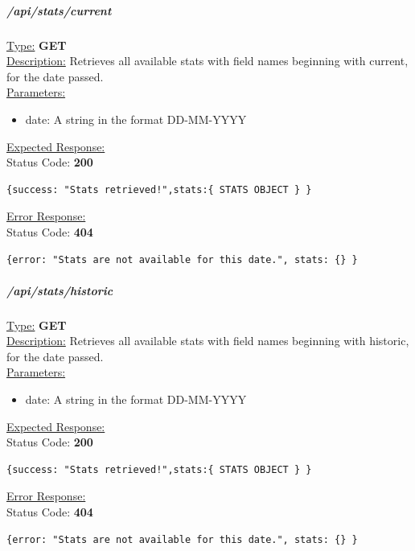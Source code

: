 \documentclass[draft,preprint,12pt,3p]{elsarticle}
\newcommand{\forceindent}{\leavevmode{\parindent=1em\indent}}
\begin{document}
\subparagraph*{/api/stats/current}
\underline{Type:} \textbf{GET}\\

\underline{Description:} Retrieves all available stats with field names beginning with current, for the date passed.\\

\underline{Parameters:}

\begin{itemize}
\item date: A string in the format DD-MM-YYYY
\end{itemize}

\underline{Expected Response:}\\[5pt]
\forceindent Status Code: \textbf{200} \\
\begin{verbatim}
{success: "Stats retrieved!",stats:{ STATS OBJECT } }
\end{verbatim}
\underline{Error Response:}\\[5pt]
\forceindent Status Code: \textbf{404} \\
\begin{verbatim}
{error: "Stats are not available for this date.", stats: {} }
\end{verbatim}


\subparagraph*{/api/stats/historic}
\underline{Type:} \textbf{GET}\\

\underline{Description:} Retrieves all available stats with field names beginning with historic, for the date passed.\\

\underline{Parameters:}
\begin{itemize}
\item date: A string in the format DD-MM-YYYY
\end{itemize}

\underline{Expected Response:}\\[5pt]
\forceindent Status Code: \textbf{200} \\
\begin{verbatim}
{success: "Stats retrieved!",stats:{ STATS OBJECT } }
\end{verbatim}
\underline{Error Response:}\\[5pt]
\forceindent Status Code: \textbf{404} \\
\begin{verbatim}
{error: "Stats are not available for this date.", stats: {} }
\end{verbatim}
\end{document}
